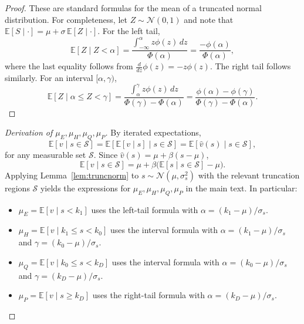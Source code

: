 \documentclass[11pt]{article}
\newcommand{\E}{\mathbb{E}}
\newcommand{\1}{\mathbf{1}}
\begin{document}
\begin{proof}
These are standard formulas for the mean of a truncated normal distribution. For completeness, let $Z\sim\mathcal{N}(0,1)$ and note that $\E[S \mid \cdot]=\mu+\sigma\,\E[Z \mid \cdot]$. For the left tail,
\[
\E[Z \mid Z<\alpha]
=\frac{\int_{-\infty}^{\alpha} z\phi(z)\,dz}{\Phi(\alpha)}
=\frac{-\phi(\alpha)}{\Phi(\alpha)},
\]
where the last equality follows from $\frac{d}{dz}\phi(z)=-z\phi(z)$. The right tail follows similarly. For an interval $[\alpha,\gamma)$,
\[
\E[Z \mid \alpha\le Z<\gamma]
=\frac{\int_{\alpha}^{\gamma} z\phi(z)\,dz}{\Phi(\gamma)-\Phi(\alpha)}
=\frac{\phi(\alpha)-\phi(\gamma)}{\Phi(\gamma)-\Phi(\alpha)}.
\]
\end{proof}

\begin{proof}[Derivation of $\mu_E,\mu_H,\mu_Q,\mu_P$]
By iterated expectations,
\[
\E[v \mid s\in\mathcal{S}]=\E[\E[v \mid s] \mid s\in\mathcal{S}]=\E[\hat{v}(s) \mid s\in\mathcal{S}],
\]
for any measurable set $\mathcal{S}$. Since $\hat{v}(s)=\mu+\beta(s-\mu)$,
\[
\E[v \mid s\in\mathcal{S}]
=\mu+\beta\big(\E[s \mid s\in\mathcal{S}]-\mu\big).
\]
Applying Lemma~\ref{lem:truncnorm} to $s\sim\mathcal{N}(\mu,\sigma_s^2)$ with the relevant truncation regions $\mathcal{S}$ yields the expressions for $\mu_E,\mu_H,\mu_Q,\mu_P$ in the main text. In particular:
\begin{itemize}[leftmargin=1.5em,itemsep=0pt]
\item $\mu_E = \E[v \mid s < k_1]$ uses the left-tail formula with $\alpha = (k_1 - \mu)/\sigma_s$.
\item $\mu_H = \E[v \mid k_1 \le s < k_0]$ uses the interval formula with $\alpha = (k_1 - \mu)/\sigma_s$ and $\gamma = (k_0 - \mu)/\sigma_s$.
\item $\mu_Q = \E[v \mid k_0 \le s < k_D]$ uses the interval formula with $\alpha = (k_0 - \mu)/\sigma_s$ and $\gamma = (k_D - \mu)/\sigma_s$.
\item $\mu_P = \E[v \mid s \ge k_D]$ uses the right-tail formula with $\alpha = (k_D - \mu)/\sigma_s$.
\end{itemize}
\end{proof}
\end{document}
